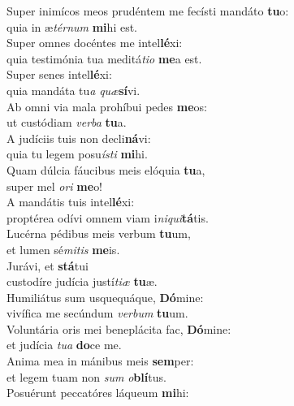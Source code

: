\evenverse Super inimícos meos prudéntem me fecísti mandáto \textbf{tu}o:~\*\\
\evenverse quia in æ\textit{tér}\textit{num} \textbf{mi}hi est.\\
\oddverse Super omnes docéntes me intel\textbf{lé}xi:~\*\\
\oddverse quia testimónia tua meditá\textit{ti}\textit{o} \textbf{me}a est.\\
\evenverse Super senes intel\textbf{lé}xi:~\*\\
\evenverse quia mandáta tu\textit{a} \textit{quæ}\textbf{sí}vi.\\
\oddverse Ab omni via mala prohíbui pedes \textbf{me}os:~\*\\
\oddverse ut custódiam \textit{ver}\textit{ba} \textbf{tu}a.\\
\evenverse A judíciis tuis non decli\textbf{ná}vi:~\*\\
\evenverse quia tu legem posu\textit{í}\textit{sti} \textbf{mi}hi.\\
\oddverse Quam dúlcia fáucibus meis elóquia \textbf{tu}a,~\*\\
\oddverse super mel \textit{o}\textit{ri} \textbf{me}o!\\
\evenverse A mandátis tuis intel\textbf{lé}xi:~\*\\
\evenverse proptérea odívi omnem viam i\textit{ni}\textit{qui}\textbf{tá}tis.\\
\oddverse Lucérna pédibus meis verbum \textbf{tu}um,~\*\\
\oddverse et lumen sé\textit{mi}\textit{tis} \textbf{me}is.\\
\evenverse Jurávi, et \textbf{stá}tui~\*\\
\evenverse custodíre judícia justí\textit{ti}\textit{æ} \textbf{tu}æ.\\
\oddverse Humiliátus sum usquequáque, \textbf{Dó}mine:~\*\\
\oddverse vivífica me secúndum \textit{ver}\textit{bum} \textbf{tu}um.\\
\evenverse Voluntária oris mei beneplácita fac, \textbf{Dó}mine:~\*\\
\evenverse et judícia \textit{tu}\textit{a} \textbf{do}ce me.\\
\oddverse Anima mea in mánibus meis \textbf{sem}per:~\*\\
\oddverse et legem tuam non \textit{sum} \textit{o}\textbf{blí}tus.\\
\evenverse Posuérunt peccatóres láqueum \textbf{mi}hi:~\*\\
